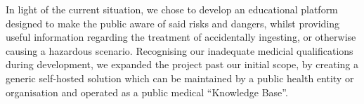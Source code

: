 In light of the current situation, we chose to develop an educational platform designed to make the public aware of said
risks and dangers, whilst providing useful information regarding the treatment of accidentally ingesting, or otherwise
causing a hazardous scenario.
Recognising our inadequate medicial qualifications during development, we expanded the project past our initial scope,
by creating a generic self-hosted solution which can be maintained by a public health entity or organisation and operated
as a public medical ``Knowledge Base''.
